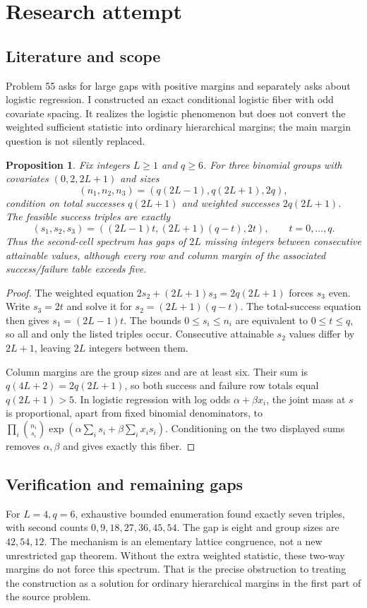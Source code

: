 \documentclass[11pt]{article}
\newtheorem{proposition}{Proposition}
\begin{document}
\section{Research attempt}
\subsection{Literature and scope}
Problem 55 asks for large gaps with positive margins and separately asks about logistic regression. I constructed an exact conditional logistic fiber with odd covariate spacing. It realizes the logistic phenomenon but does not convert the weighted sufficient statistic into ordinary hierarchical margins; the main margin question is not silently replaced.
\begin{proposition}
Fix integers $L\ge1$ and $q\ge6$. For three binomial groups with covariates $(0,2,2L+1)$ and sizes
\[
(n_1,n_2,n_3)=(q(2L-1),q(2L+1),2q),
\]
condition on total successes $q(2L+1)$ and weighted successes $2q(2L+1)$. The feasible success triples are exactly
\[
(s_1,s_2,s_3)=((2L-1)t,(2L+1)(q-t),2t),\qquad t=0,\ldots,q.
\]
Thus the second-cell spectrum has gaps of $2L$ missing integers between consecutive attainable values, although every row and column margin of the associated success/failure table exceeds five.
\end{proposition}
\begin{proof}
The weighted equation $2s_2+(2L+1)s_3=2q(2L+1)$ forces $s_3$ even. Write $s_3=2t$ and solve it for $s_2=(2L+1)(q-t)$. The total-success equation then gives $s_1=(2L-1)t$. The bounds $0\le s_i\le n_i$ are equivalent to $0\le t\le q$, so all and only the listed triples occur. Consecutive attainable $s_2$ values differ by $2L+1$, leaving $2L$ integers between them.

Column margins are the group sizes and are at least six. Their sum is $q(4L+2)=2q(2L+1)$, so both success and failure row totals equal $q(2L+1)>5$. In logistic regression with log odds $\alpha+\beta x_i$, the joint mass at $s$ is proportional, apart from fixed binomial denominators, to $\prod_i\binom{n_i}{s_i}\exp(\alpha\sum_i s_i+\beta\sum_i x_is_i)$. Conditioning on the two displayed sums removes $\alpha,\beta$ and gives exactly this fiber.
\end{proof}
\subsection{Verification and remaining gaps}
For $L=4,q=6$, exhaustive bounded enumeration found exactly seven triples, with second counts $0,9,18,27,36,45,54$. The gap is eight and group sizes are $42,54,12$. The mechanism is an elementary lattice congruence, not a new unrestricted gap theorem. Without the extra weighted statistic, these two-way margins do not force this spectrum. That is the precise obstruction to treating the construction as a solution for ordinary hierarchical margins in the first part of the source problem.
\end{document}
